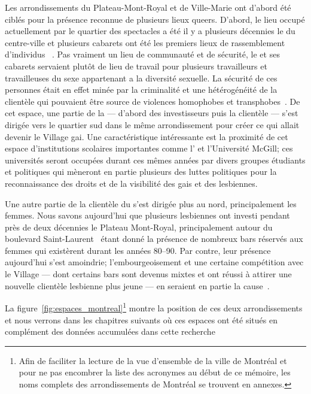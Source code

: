 Les arrondissements du Plateau-Mont-Royal et de Ville-Marie ont d'abord été ciblés pour la présence reconnue de plusieurs lieux queers.
D'abord, le lieu occupé actuellement par le quartier des spectacles a été il y a plusieurs décennies le  du centre-ville et plusieurs cabarets ont été les premiers lieux de rassemblement d'individus \lgbt{}~\citep[198]{Podmore2015}.
Pas vraiment un lieu de communauté et de sécurité, le  et ses cabarets servaient plutôt de lieu de travail pour plusieurs travailleurs et travailleuses du sexe appartenant a la diversité sexuelle.
La sécurité de ces personnes était en effet minée par la criminalité et une hétérogénéité de la clientèle qui pouvaient être source de violences homophobes et transphobes~\parencite[91]{Higgins1999}.
De cet espace, une partie de la  --- d'abord des investisseurs puis la clientèle --- s'est dirigée vers le quartier sud dans le même arrondissement pour créer ce qui allait devenir le Village gai.
Une caractéristique intéressante est la proximité de cet espace d'institutions scolaires importantes comme l'\uqam{} et l'Université McGill; ces universités seront occupées durant ces mêmes années par divers groupes étudiants et politiques qui mèneront en partie plusieurs des luttes politiques pour la reconnaissance des droits et de la visibilité des gais et des lesbiennes.

Une autre partie de la clientèle \lgbt{} du  s'est dirigée plus au nord, principalement les femmes.
Nous savons aujourd'hui que plusieurs lesbiennes ont investi pendant près de deux décennies le Plateau Mont-Royal, principalement autour du boulevard Saint-Laurent~\citep[599]{Podmore2006} étant donné la présence de nombreux bars réservés aux femmes qui existèrent durant les années 80--90.
Par contre, leur présence aujourd'hui s'est amoindrie; l'embourgeoisement et une certaine compétition avec le Village --- dont certains bars sont devenus mixtes et ont réussi à attirer une nouvelle clientèle lesbienne plus jeune --- en seraient en partie la cause~\citep{Podmore2015}.

La figure~\ref{fig:espaces_montreal}\footnote{Afin de faciliter la lecture de la vue d'ensemble de la ville de Montréal et pour ne pas encombrer la liste des acronymes au début de ce mémoire, les noms complets des arrondissements de Montréal se trouvent en annexes.} montre la position de ces deux arrondissements et nous verrons dans les chapitres suivants où ces espaces ont été situés en complément des données accumulées dans cette recherche 

